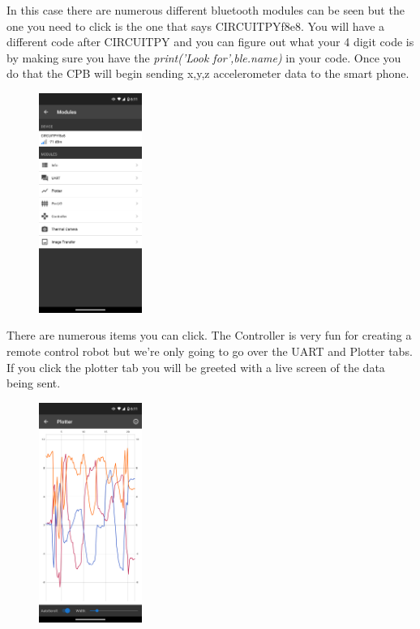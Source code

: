 In this case there are numerous different bluetooth modules can be seen but the one you need to click is the one that says CIRCUITPYf8e8. You will have a different code after CIRCUITPY and you can figure out what your 4 digit code is by making sure you have the {\it print('Look for',ble.name)} in your code. Once you do that the CPB will begin sending x,y,z accelerometer data to the smart phone. 
\begin{figure}[H]
  \begin{center}
    \includegraphics[width=0.3\textwidth]{Figures/phoneapp2.png}
  \end{center}
\end{figure}
There are numerous items you can click. The Controller is very fun for creating a remote control robot but we're only going to go over the UART and Plotter tabs. If you click the plotter tab you will be greeted with a live screen of the data being sent.
\begin{figure}[H]
  \begin{center}
    \includegraphics[width=0.3\textwidth]{Figures/phoneapp3.png}
  \end{center}
\end{figure}
